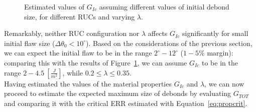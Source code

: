 \documentclass[12pt,a4paper]{article}
\begin{document}
\begin{figure}[!h]
\centering
    \quad 
\caption{Estimated values of $G_{Ic}$ assuming different values of initial debond size, for different RUCs and varying $\lambda$.}\label{fig:GIc}
\end{figure}

Remarkably, neither RUC configuration nor $\lambda$ affects $G_{Ic}$ significantly for small initial flaw size ($\Delta\theta_{0}<10^{\circ}$). Based on the considerations of the previous section, we can expect the initial flaw to be in the range $2^{\circ}-12^{\circ}$ ($1-5\%$ margin): comparing this with the results of Figure~\ref{fig:GIc}, we can assume $G_{Ic}$ to be in the range $2-4.5\ \left[\frac{J}{m^{2}}\right]$, while $0.2\leq\lambda\leq0.35$.\\
Having estimated the values of the material properties $G_{Ic}$ and $\lambda$, we can now proceed to estimate the expected maximum size of debonds by evaluating $G_{TOT}$ and comparing it with the critical ERR estimated with Equation~\ref{eq:propcrit}.
\end{document}
